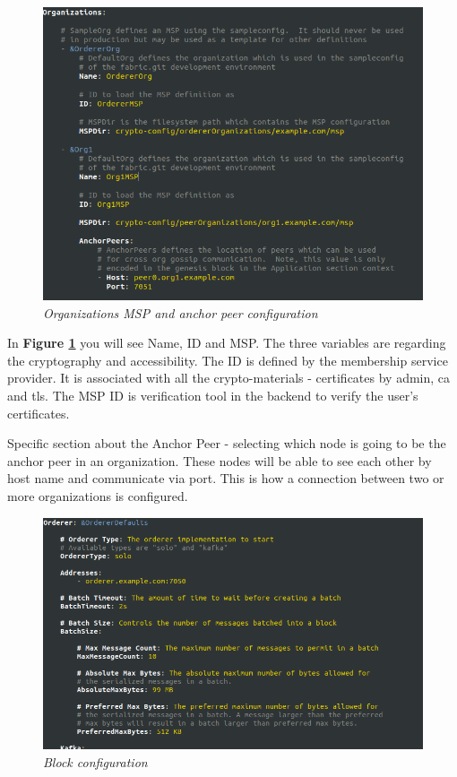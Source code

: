 \documentclass[a4paper,11pt]{report}
\begin{document}
\begin{figure}[h]
\centering
  \includegraphics[width = 16cm]{configtx1.png}
  \caption{\textit{Organizations MSP and anchor peer configuration}}
  \label{configtx1}
\end{figure}

In \textbf{Figure \ref{configtx1}} you will see Name, ID and MSP. The three variables are regarding the cryptography and accessibility. The ID is defined by the membership service provider. It is associated with all the crypto-materials - certificates by admin, ca and tls. The MSP ID is verification tool in the backend to verify the user's certificates.
  
Specific section about the Anchor Peer - selecting which node is going to be the anchor peer in an organization. These nodes will be able to see each other by host name and communicate via port. This is how a connection between two or more organizations is configured. 

\begin{figure}[h]
\centering
  \includegraphics[width = 16cm]{configtx2.png}
  \caption{\textit{Block configuration}}
  \label{configtx2}
\end{figure}
\end{document}
